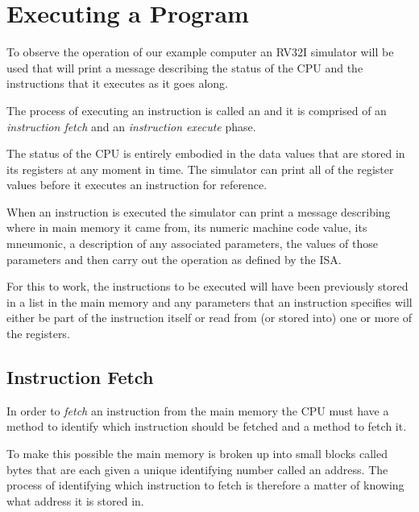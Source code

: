 \section{Executing a Program}

To observe the operation of our example computer an RV32I simulator 
will be used that will print a message describing the status of the 
CPU and the instructions that it executes as it goes along.

The process of executing an instruction is called an
 and it is comprised
of an {\em instruction fetch} and an {\em instruction execute} phase.
 
The status of the CPU is entirely embodied in the data values that
are stored in its registers at any moment in time.  The simulator 
can print all of the register values before it executes an instruction 
for reference.

When an instruction is executed the simulator can print a message
describing where in main memory it came from, its numeric machine code 
value, its mneumonic, a description of any associated parameters, 
the values of those parameters and then carry out the operation as 
defined by the ISA.

For this to work, the instructions to be executed will have been 
previously stored in a list in the main memory and any parameters that 
an instruction specifies will either be part of the instruction itself 
or read from (or stored into) one or more of the registers.


\subsection{Instruction Fetch}

In order to {\em fetch} an instruction from the main memory the CPU
must have a method to identify which instruction should be fetched and
a method to fetch it. 

To make this possible the main memory is broken up into small blocks
called \gls{byte}s that are each given a unique identifying number 
called an \gls{address}.  The process of identifying which instruction
to fetch is therefore a matter of knowing what address it is stored in.

